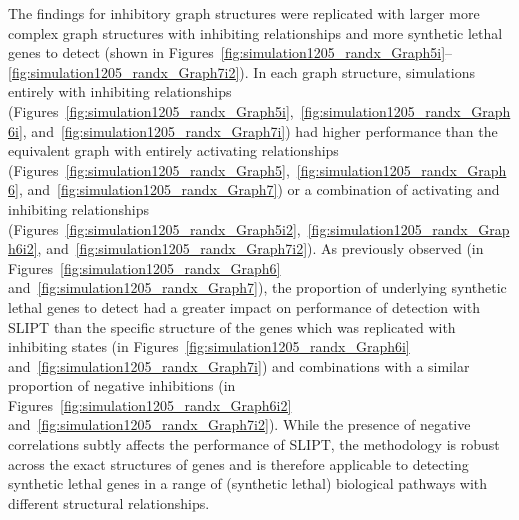 The findings for inhibitory \gls{graph} structures were replicated with larger more complex \gls{graph} structures with inhibiting relationships and more \gls{synthetic lethal} genes to detect (shown in Figures~\ref{fig:simulation1205_randx_Graph5i}\nobreakdash--\ref{fig:simulation1205_randx_Graph7i2}). In each \gls{graph} structure, simulations entirely with inhibiting relationships (Figures~\ref{fig:simulation1205_randx_Graph5i},~\ref{fig:simulation1205_randx_Graph6i}, and~\ref{fig:simulation1205_randx_Graph7i}) had higher performance than the equivalent graph with entirely activating relationships (Figures~\ref{fig:simulation1205_randx_Graph5},~\ref{fig:simulation1205_randx_Graph6}, and~\ref{fig:simulation1205_randx_Graph7}) or a combination of activating and inhibiting relationships (Figures~\ref{fig:simulation1205_randx_Graph5i2},~\ref{fig:simulation1205_randx_Graph6i2}, and~\ref{fig:simulation1205_randx_Graph7i2}). As previously observed (in Figures~\ref{fig:simulation1205_randx_Graph6} and~\ref{fig:simulation1205_randx_Graph7}), the proportion of underlying \gls{synthetic lethal} genes to detect had a greater impact on performance of detection with \gls{SLIPT} than the specific structure of the genes which was replicated with inhibiting states (in Figures~\ref{fig:simulation1205_randx_Graph6i} and~\ref{fig:simulation1205_randx_Graph7i}) and combinations with a similar proportion of negative inhibitions (in Figures~\ref{fig:simulation1205_randx_Graph6i2} and~\ref{fig:simulation1205_randx_Graph7i2}). While the presence of negative correlations subtly affects the performance of \gls{SLIPT}, the methodology is robust across the exact structures of genes and is therefore applicable to detecting \gls{synthetic lethal} genes in a range of (synthetic lethal) biological pathways with different structural relationships.



